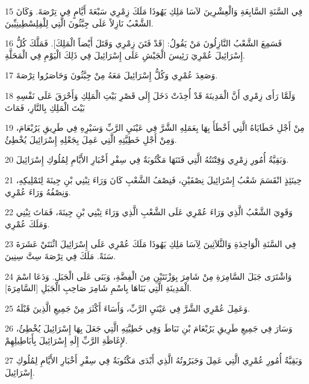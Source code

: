 \par 15 فِي السَّنَةِ السَّابِعَةِ وَالْعِشْرِينَ لآسَا مَلِكِ يَهُوذَا مَلَكَ زِمْرِي سَبْعَةَ أَيَّامٍ فِي تِرْصَةَ. وَكَانَ الشَّعْبُ نَازِلاً عَلَى جِبَّثُونَ الَّتِي لِلْفِلِسْطِينِيِّينَ.
\par 16 فَسَمِعَ الشَّعْبُ النَّازِلُونَ مَنْ يَقُولُ: [قَدْ فَتَنَ زِمْرِي وَقَتَلَ أَيْضاً الْمَلِكَ]. فَمَلَّكَ كُلُّ إِسْرَائِيلَ عُمْرِيَ رَئِيسَ الْجَيْشِ عَلَى إِسْرَائِيلَ فِي ذَلِكَ الْيَوْمِ فِي الْمَحَلَّةِ.
\par 17 وَصَعِدَ عُمْرِي وَكُلُّ إِسْرَائِيلَ مَعَهُ مِنْ جِبَّثُونَ وَحَاصَرُوا تِرْصَةَ.
\par 18 وَلَمَّا رَأَى زِمْرِي أَنَّ الْمَدِينَةَ قَدْ أُخِذَتْ دَخَلَ إِلَى قَصْرِ بَيْتِ الْمَلِكِ وَأَحْرَقَ عَلَى نَفْسِهِ بَيْتَ الْمَلِكِ بِالنَّارِ، فَمَاتَ
\par 19 مِنْ أَجْلِ خَطَايَاهُ الَّتِي أَخْطَأَ بِهَا بِعَمَلِهِ الشَّرَّ فِي عَيْنَيِ الرَّبِّ وَسَيْرِهِ فِي طَرِيقِ يَرُبْعَامَ، وَمِنْ أَجْلِ خَطِيَّتِهِ الَّتِي عَمِلَ بِجَعْلِهِ إِسْرَائِيلَ يُخْطِئُ.
\par 20 وَبَقِيَّةُ أُمُورِ زِمْرِي وَفِتْنَتُهُ الَّتِي فَتَنَهَا مَكْتُوبَةٌ فِي سِفْرِ أَخْبَارِ الأَيَّامِ لِمُلُوكِ إِسْرَائِيلَ.
\par 21 حِينَئِذٍ انْقَسَمَ شَعْبُ إِسْرَائِيلَ نِصْفَيْنِ، فَنِصْفُ الشَّعْبِ كَانَ وَرَاءَ تِبْنِي بْنِ جِينَةَ لِتَمْلِيكِهِ، وَنِصْفُهُ وَرَاءَ عُمْرِي.
\par 22 وَقَوِيَ الشَّعْبُ الَّذِي وَرَاءَ عُمْرِي عَلَى الشَّعْبِ الَّذِي وَرَاءَ تِبْنِي بْنِ جِينَةَ، فَمَاتَ تِبْنِي وَمَلَكَ عُمْرِي.
\par 23 فِي السَّنَةِ الْوَاحِدَةِ وَالثَّلاَثِينَ لِآسَا مَلِكِ يَهُوذَا مَلَكَ عُمْرِي عَلَى إِسْرَائِيلَ اثْنَتَيْ عَشَرَةَ سَنَةً. مَلَكَ فِي تِرْصَةَ سِتَّ سِنِينَ.
\par 24 وَاشْتَرَى جَبَلَ السَّامِرَةِ مِنْ شَامِرَ بِوَزْنَتَيْنِ مِنَ الْفِضَّةِ، وَبَنَى عَلَى الْجَبَلِ. وَدَعَا اسْمَ الْمَدِينَةِ الَّتِي بَنَاهَا بِاسْمِ شَامِرَ صَاحِبِ الْجَبَلِ [السَّامِرَةَ].
\par 25 وَعَمِلَ عُمْرِي الشَّرَّ فِي عَيْنَيِ الرَّبِّ، وَأَسَاءَ أَكْثَرَ مِنْ جَمِيعِ الَّذِينَ قَبْلَهُ.
\par 26 وَسَارَ فِي جَمِيعِ طَرِيقِ يَرُبْعَامَ بْنِ نَبَاطَ وَفِي خَطِيَّتِهِ الَّتِي جَعَلَ بِهَا إِسْرَائِيلَ يُخْطِئُ، لإِغَاظَةِ الرَّبِّ إِلَهِ إِسْرَائِيلَ بِأَبَاطِيلِهِمْ.
\par 27 وَبَقِيَّةُ أُمُورِ عُمْرِي الَّتِي عَمِلَ وَجَبَرُوتُهُ الَّذِي أَبْدَى مَكْتُوبَةٌ فِي سِفْرِ أَخْبَارِ الأَيَّامِ لِمُلُوكِ إِسْرَائِيلَ.
